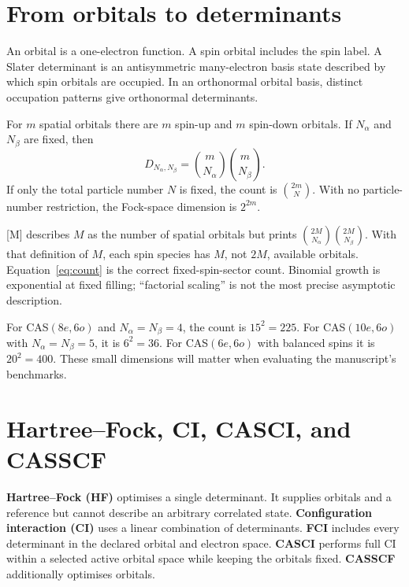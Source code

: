 \documentclass[11pt,a4paper,oneside]{report}
\begin{document}
\section{From orbitals to determinants}
An orbital is a one-electron function. A spin orbital includes the spin label. A Slater determinant is an antisymmetric many-electron basis state described by which spin orbitals are occupied. In an orthonormal orbital basis, distinct occupation patterns give orthonormal determinants.

For $m$ spatial orbitals there are $m$ spin-up and $m$ spin-down orbitals. If $N_\alpha$ and $N_\beta$ are fixed, then
\begin{equation}\label{eq:count}
D_{N_\alpha,N_\beta}=\binom{m}{N_\alpha}\binom{m}{N_\beta}.
\end{equation}
If only the total particle number $N$ is fixed, the count is $\binom{2m}{N}$. With no particle-number restriction, the Fock-space dimension is $2^{2m}$.

\begin{caution}
{[M]} describes $M$ as the number of spatial orbitals but prints $\binom{2M}{N_\alpha}\binom{2M}{N_\beta}$. With that definition of $M$, each spin species has $M$, not $2M$, available orbitals. Equation~\eqref{eq:count} is the correct fixed-spin-sector count. Binomial growth is exponential at fixed filling; ``factorial scaling'' is not the most precise asymptotic description.
\end{caution}

For CAS$(8e,6o)$ and $N_\alpha=N_\beta=4$, the count is $15^2=225$. For CAS$(10e,6o)$ with $N_\alpha=N_\beta=5$, it is $6^2=36$. For CAS$(6e,6o)$ with balanced spins it is $20^2=400$. These small dimensions will matter when evaluating the manuscript's benchmarks.

\section{Hartree--Fock, CI, CASCI, and CASSCF}
\textbf{Hartree--Fock (HF)} optimises a single determinant. It supplies orbitals and a reference but cannot describe an arbitrary correlated state. \textbf{Configuration interaction (CI)} uses a linear combination of determinants. \textbf{FCI} includes every determinant in the declared orbital and electron space. \textbf{CASCI} performs full CI within a selected active orbital space while keeping the orbitals fixed. \textbf{CASSCF} additionally optimises orbitals.
\end{document}
